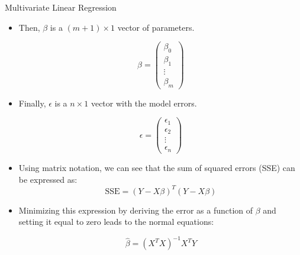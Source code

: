 \documentclass[handout]{beamer}
\begin{document}
\begin{frame}{Multivariate Linear Regression}
\scriptsize{
\begin{itemize}
 \item Then, $\beta$ is a $(m+1) \times 1$ vector of parameters.

\begin{displaymath}
 \beta =
 \begin{pmatrix}
  \beta_{0}  \\
  \beta_{1}  \\
  \vdots    \\
  \beta_{m} 
 \end{pmatrix}
\end{displaymath}


\item Finally, $\epsilon$  is a $n \times 1$ vector with the model errors. 

\begin{displaymath}
 \epsilon =
 \begin{pmatrix}
  \epsilon_{1}  \\
  \epsilon_{2}  \\
  \vdots    \\
  \epsilon_{n} 
 \end{pmatrix}
\end{displaymath}

\item  Using matrix notation, we can see that the sum of squared errors (SSE) can be expressed as:
\begin{displaymath}
 \text{SSE} = (Y - X\beta)^{T}(Y-X\beta)
\end{displaymath}

\item Minimizing this expression by deriving the error as a function of $\beta$ and setting it equal to zero leads to the normal equations:

\begin{displaymath}
   \hat{\beta} = (X^{T}X)^{-1} X^{T}Y
\end{displaymath}


\end{itemize}


}

\end{frame}
\end{document}
